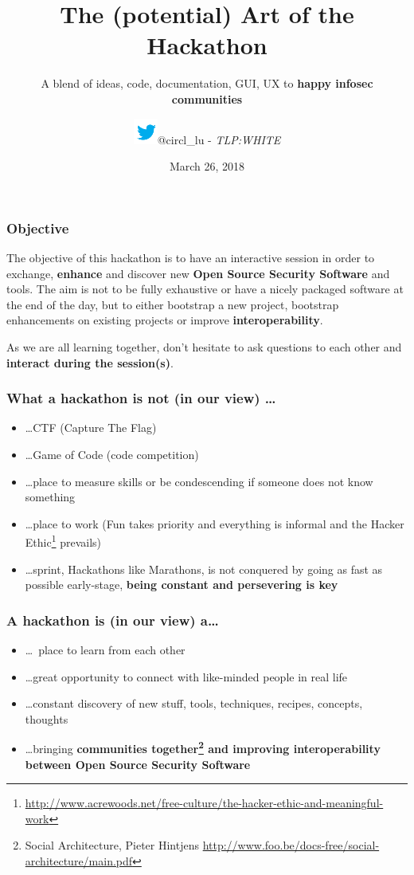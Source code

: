 \documentclass{beamer}
\author{\includegraphics[height=.04\paperheight]{twitter.png}@circl\_lu - \emph{TLP:WHITE}}
\title{The (potential) Art of the Hackathon}
\subtitle{A blend of ideas, code, documentation, GUI, UX to {\bf happy infosec communities}}
\institute{\url{info@hack.lu}}
\date{March 26, 2018}
\begin{document}
  \begin{frame}[t,plain]
    \titlepage
  \end{frame}

  \begin{frame}
    \frametitle{Objective}
    \begin{center}
            The objective of this hackathon is to have an interactive session in order to exchange, {\bf enhance} and discover new {\bf Open Source Security Software} and tools. The aim is not to be fully exhaustive or have a nicely packaged software at the end of the day, but to either bootstrap a new project, bootstrap enhancements on existing projects or improve {\bf interoperability}.
    \end{center}
    \begin{center}
       As we are all learning together, don't hesitate to ask questions to each other and {\bf interact during the session(s)}.
    \end{center}
  \end{frame}

  \begin{frame}
          \frametitle{What a hackathon is not (in our view) \ldots}
    \begin{itemize}
      \item \ldots CTF (Capture The Flag)
      \item \ldots Game of Code (code competition)
      \item \ldots place to measure skills or be condescending if someone does not know something
      \item \ldots place to work (Fun takes priority and everything is informal and the Hacker Ethic\footnote{\url{http://www.acrewoods.net/free-culture/the-hacker-ethic-and-meaningful-work}} prevails)
      \item \ldots sprint, Hackathons like Marathons, is not conquered by going as fast as possible early-stage, {\bf being constant and persevering is key}
    \end{itemize}
  \end{frame}

  \begin{frame}
          \frametitle{A hackathon is (in our view) a\ldots}
    \begin{itemize}
      \item \ldots place to learn from each other
      \item \ldots great opportunity to connect with like-minded people in real life
      \item \ldots constant discovery of new stuff, tools, techniques, recipes, concepts, thoughts
      \item \ldots bringing {\bf communities together\footnote{\tiny Social Architecture, Pieter Hintjens \url{http://www.foo.be/docs-free/social-architecture/main.pdf}} and improving interoperability between Open Source Security Software}
    \end{itemize}
  \end{frame}
\end{document}
